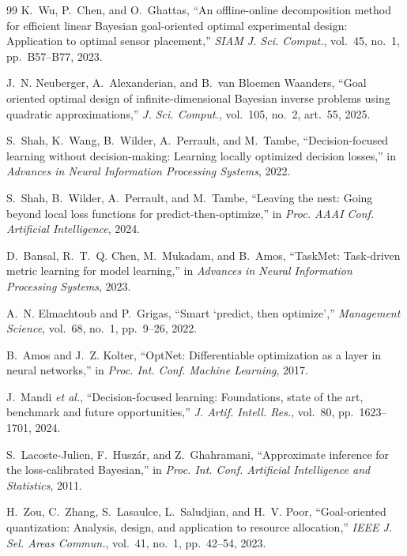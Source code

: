 \documentclass{article}
\theoremstyle{definition}
\theoremstyle{remark}
\begin{document}
\begin{thebibliography}{99}
 K.~Wu, P.~Chen, and O.~Ghattas, ``An offline-online
decomposition method for efficient linear Bayesian goal-oriented optimal
experimental design: Application to optimal sensor placement,'' \emph{SIAM
J. Sci. Comput.}, vol.~45, no.~1, pp.~B57--B77, 2023.

 J.~N. Neuberger, A.~Alexanderian, and B.~van
Bloemen Waanders, ``Goal oriented optimal design of infinite-dimensional
Bayesian inverse problems using quadratic approximations,'' \emph{J. Sci.
Comput.}, vol.~105, no.~2, art.~55, 2025.

 S.~Shah, K.~Wang, B.~Wilder, A.~Perrault, and M.~Tambe,
``Decision-focused learning without decision-making: Learning locally
optimized decision losses,'' in \emph{Advances in Neural Information
Processing Systems}, 2022.

 S.~Shah, B.~Wilder, A.~Perrault, and M.~Tambe, ``Leaving
the nest: Going beyond local loss functions for predict-then-optimize,'' in
\emph{Proc. AAAI Conf. Artificial Intelligence}, 2024.

 D.~Bansal, R.~T.~Q. Chen, M.~Mukadam, and B.~Amos,
``TaskMet: Task-driven metric learning for model learning,'' in \emph{Advances
in Neural Information Processing Systems}, 2023.

 A.~N. Elmachtoub and P.~Grigas, ``Smart `predict,
then optimize','' \emph{Management Science}, vol.~68, no.~1, pp.~9--26, 2022.

 B.~Amos and J.~Z. Kolter, ``OptNet: Differentiable
optimization as a layer in neural networks,'' in \emph{Proc. Int. Conf.
Machine Learning}, 2017.

 J.~Mandi \emph{et al.}, ``Decision-focused learning:
Foundations, state of the art, benchmark and future opportunities,'' \emph{J.
Artif. Intell. Res.}, vol.~80, pp.~1623--1701, 2024.

 S.~Lacoste-Julien, F.~Husz\'ar, and
Z.~Ghahramani, ``Approximate inference for the loss-calibrated Bayesian,'' in
\emph{Proc. Int. Conf. Artificial Intelligence and Statistics}, 2011.

 H.~Zou, C.~Zhang, S.~Lasaulce, L.~Saludjian, and H.~V.
Poor, ``Goal-oriented quantization: Analysis, design, and application to
resource allocation,'' \emph{IEEE J. Sel. Areas Commun.}, vol.~41, no.~1,
pp.~42--54, 2023.


\end{thebibliography}
\end{document}
